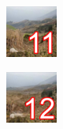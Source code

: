 \documentclass[11pt, a4paper]{article}
\begin{document}
\begin{task}
\begin{gridlayout}{\textwidth}{12cm}
\begin{row}{0.34}
\begin{cell}{0.25}
            \end{cell}
            \begin{cell}{0.25}
                \centering
                \includegraphics[width=0.9\cellwidth]{img/thumbnail-11.png}
            \end{cell}
            \begin{cell}{0.25}
                \centering
                \includegraphics[width=0.9\cellwidth]{img/thumbnail-12.png}
            \end{cell}
        \end{row}
    \end{gridlayout}
\end{task}

\newpage







\tasktwelve
\end{document}
